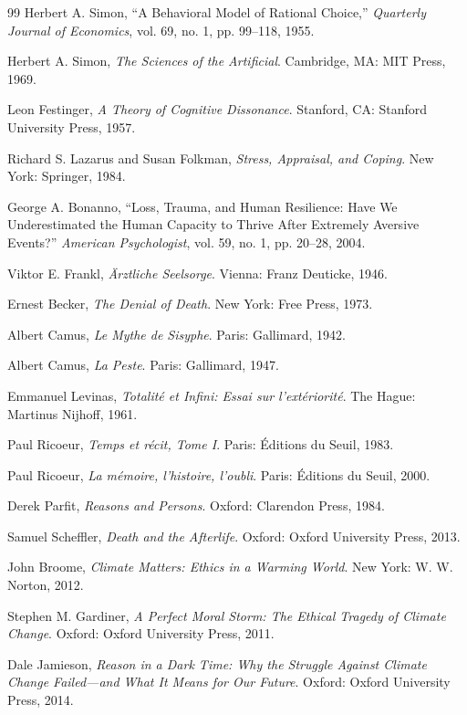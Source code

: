 \documentclass[11pt,oneside]{book}
\theoremstyle{definition}
\theoremstyle{remark}
\begin{document}
\begin{thebibliography}{99}
 Herbert A. Simon, ``A Behavioral Model of Rational Choice,'' \emph{Quarterly Journal of
  Economics}, vol. 69, no. 1, pp. 99--118, 1955.

 Herbert A. Simon, \emph{The Sciences of the Artificial}. Cambridge, MA: MIT Press, 1969.

 Leon Festinger, \emph{A Theory of Cognitive Dissonance}. Stanford, CA: Stanford University
  Press, 1957.

 Richard S. Lazarus and Susan Folkman, \emph{Stress, Appraisal, and Coping}. New York: Springer,
  1984.

 George A. Bonanno, ``Loss, Trauma, and Human Resilience: Have We Underestimated the Human
  Capacity to Thrive After Extremely Aversive Events?'' \emph{American Psychologist}, vol. 59,
  no. 1, pp. 20--28, 2004.

 Viktor E. Frankl, \emph{\"Arztliche Seelsorge}. Vienna: Franz Deuticke, 1946.

 Ernest Becker, \emph{The Denial of Death}. New York: Free Press, 1973.

 Albert Camus, \emph{Le Mythe de Sisyphe}. Paris: Gallimard, 1942.

 Albert Camus, \emph{La Peste}. Paris: Gallimard, 1947.

 Emmanuel Levinas, \emph{Totalit\'e et Infini: Essai sur l'ext\'eriorit\'e}. The Hague: Martinus
  Nijhoff, 1961.

 Paul Ricoeur, \emph{Temps et r\'ecit, Tome I}. Paris: \'Editions du Seuil, 1983.

 Paul Ricoeur, \emph{La m\'emoire, l'histoire, l'oubli}. Paris: \'Editions du Seuil, 2000.

 Derek Parfit, \emph{Reasons and Persons}. Oxford: Clarendon Press, 1984.

 Samuel Scheffler, \emph{Death and the Afterlife}. Oxford: Oxford University Press, 2013.

 John Broome, \emph{Climate Matters: Ethics in a Warming World}. New York: W. W. Norton, 2012.

 Stephen M. Gardiner, \emph{A Perfect Moral Storm: The Ethical Tragedy of Climate Change}.
  Oxford: Oxford University Press, 2011.

 Dale Jamieson, \emph{Reason in a Dark Time: Why the Struggle Against Climate Change Failed---and
  What It Means for Our Future}. Oxford: Oxford University Press, 2014.


\end{thebibliography}
\end{document}
